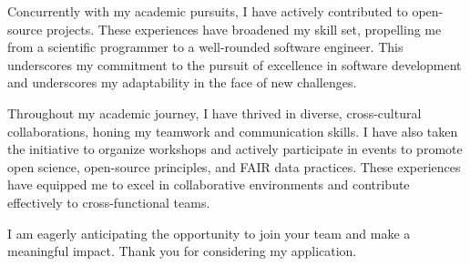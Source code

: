 \documentclass[11pt, a4paper]{awesome-cv}
\begin{document}
\begin{cvletter}
Concurrently with my academic pursuits, I have actively contributed to open-source projects. These experiences have broadened my skill set, propelling me from a scientific programmer to a well-rounded software engineer. This underscores my commitment to the pursuit of excellence in software development and underscores my adaptability in the face of new challenges.

Throughout my academic journey, I have thrived in diverse, cross-cultural collaborations, honing my teamwork and communication skills. I have also taken the initiative to organize workshops and actively participate in events to promote open science, open-source principles, and FAIR data practices. These experiences have equipped me to excel in collaborative environments and contribute effectively to cross-functional teams.

I am eagerly anticipating the opportunity to join your team and make a meaningful impact. Thank you for considering my application.


\end{cvletter}


\makeletterclosing
\end{document}
